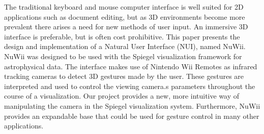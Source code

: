 \fontsize{9}{11}\selectfont The traditional keyboard and mouse computer
interface is well suited for 2D applications such as document editing, but as 3D
environments become more prevalent there arises a need for new methods of user
input. An immersive 3D interface is preferable, but is often cost prohibitive.
This paper presents the design and implementation of a Natural User Interface
(NUI), named NuWii. NuWii was designed to be used with the Spiegel visualization
framework for astrophysical data. The interface makes use of Nintendo Wii
Remotes as infrared tracking cameras to detect 3D gestures made by the user.
These gestures are interpreted and used to control the viewing camera.s
parameters throughout the course of a visualization. Our project provides a new,
more intuitive way of manipulating the camera in the Spiegel visualization
system. Furthermore, NuWii provides an expandable base that could be used for
gesture control in many other applications.  
